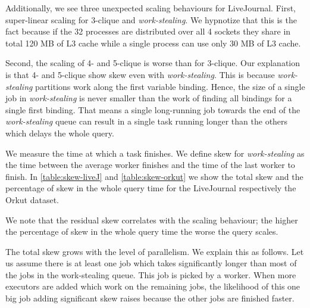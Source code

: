 Additionally, we see three unexpected scaling behaviours for LiveJournal.
First, super-linear scaling for 3-clique and \textit{work-stealing}.
We hypnotize that this is the fact because if the 32 processes are distributed over all 4 sockets they share in total
120 MB of L3 cache while a single process can use only 30 MB of L3 cache.

Second, the scaling of 4- and 5-clique is worse than for 3-clique.
Our explanation is that 4- and 5-clique show skew even with \textit{work-stealing}.
%
This is because \textit{work-stealing} partitions work along the first variable binding.
Hence, the size of a single job in \textit{work-stealing} is never smaller than the work of finding all bindings for a single
first binding.
That means a single long-running job towards the end of the \textit{work-stealing} queue can
result in a single task running longer than the others which delays the whole query.

We measure the time at which a task finishes.
We define skew for \textit{work-stealing} as the time between the average worker finishes and
the time of the last worker to finish.
In \cref{table:skew-liveJ} and \cref{table:skew-orkut} we show the total skew and the percentage of
skew in the whole query time for the LiveJournal respectively the Orkut dataset.

We note that the residual skew correlates with the scaling behaviour;
the higher the percentage of skew in the whole query time the worse the query scales.

The total skew grows with the level of parallelism.
We explain this as follows.
Let us assume there is at least one job which takes significantly longer than most of the jobs in
the work-stealing queue.
This job is picked by a worker.
When more executors are added which work on the remaining jobs, the likelihood of this one big
job adding significant skew raises because the other jobs are finished faster.

